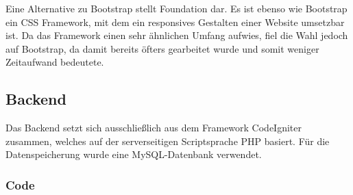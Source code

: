       Eine Alternative zu Bootstrap stellt {Foundation\cite{foundation}} dar. Es ist ebenso wie Bootstrap ein CSS Framework, mit dem ein responsives Gestalten einer Website umsetzbar ist.
      Da das Framework einen sehr ähnlichen Umfang aufwies, fiel die Wahl jedoch auf Bootstrap, da damit bereits öfters gearbeitet wurde und somit weniger Zeitaufwand bedeutete.

    \subsection*{Backend}
    Das Backend setzt sich ausschließlich aus dem Framework CodeIgniter zusammen, welches auf der serverseitigen Scriptsprache PHP basiert. Für die Datenspeicherung
    wurde eine MySQL-Datenbank verwendet.

      \subsubsection*{Code}
